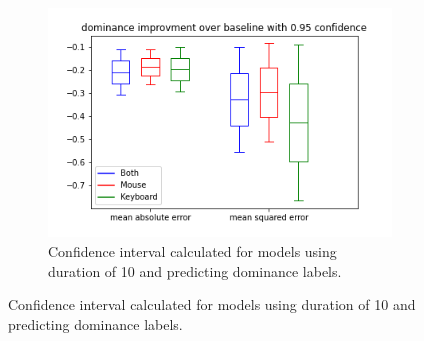 \documentclass[../main.tex]{subfiles}
\begin{document}
\begin{figure}[!h]
\begin{subfigure}[b]{0.31\textwidth}
        \centering
        \includegraphics[width=\textwidth]{figures/results/interval_difference/10/10_dominance_0.95.png}
        \captionsetup{justification=centering}
        \caption{Confidence interval calculated for models using duration of 10 and predicting dominance labels.}
    \end{subfigure}
\end{figure}
\end{document}
